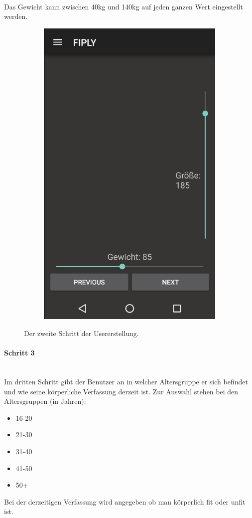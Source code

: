 \documentclass[FIPLY_base.tex]{subfiles}
\begin{document}
\ \\
Das Gewicht kann zwischen 40kg und 140kg auf jeden ganzen Wert eingestellt werden.
\begin{figure}[H]
	\begin{subfigure}[b]{0.3\textwidth}
	\includegraphics[scale=0.55]{img/User_step2}
	\end{subfigure}
	\hfil
	\caption{Der zweite Schritt der Usererstellung.}
\end{figure}
\paragraph{Schritt 3}\ \\
Im dritten Schritt gibt der Benutzer an in welcher Altersgruppe er sich befindet und wie seine körperliche Verfassung derzeit ist.
Zur Auswahl stehen bei den Altersgruppen (in Jahren):
\begin{itemize}
\item 16-20
\item 21-30
\item 31-40
\item 41-50
\item 50+
\end{itemize}
Bei der derzeitigen Verfassung wird angegeben ob man körperlich fit oder unfit ist.
\end{document}
